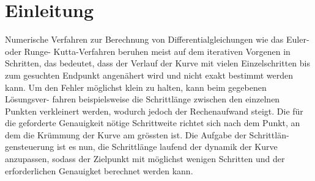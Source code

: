 %
%
%
\section{Einleitung\label{steps:section:einleitung}}

Numerische Verfahren zur Berechnung von Differentialgleichungen wie das Euler- oder Runge-
Kutta-Verfahren beruhen meist auf dem iterativen Vorgenen in Schritten, das bedeutet, dass der Verlauf
der Kurve mit vielen Einzelschritten bis zum gesuchten Endpunkt angenähert wird und nicht exakt
bestimmt werden kann. Um den Fehler möglichst klein zu halten, kann beim gegebenen Lösungsver-
fahren beispielsweise die Schrittlänge zwischen den einzelnen Punkten verkleinert werden, wodurch
jedoch der Rechenaufwand steigt. Die für die geforderte Genauigkeit nötige Schrittweite richtet sich
nach dem Punkt, an dem die Krümmung der Kurve am grössten ist. Die Aufgabe der Schrittlän-
gensteuerung ist es nun, die Schrittlänge laufend der dynamik der Kurve anzupassen, sodass der
Zielpunkt mit möglichst wenigen Schritten und der erforderlichen Genauigket berechnet werden
kann.
